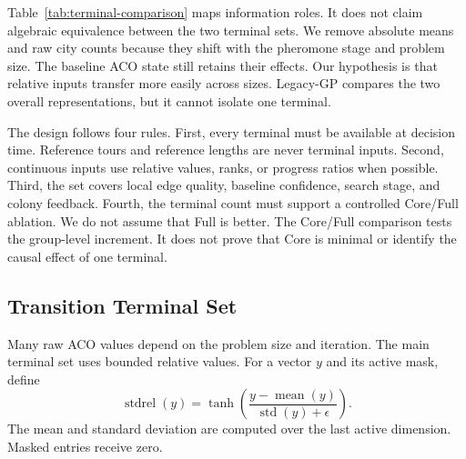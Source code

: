 \documentclass[letterpaper,journal]{IEEEtran}
\newcommand{\stdrel}{\operatorname{stdrel}}
\begin{document}
Table~\ref{tab:terminal-comparison} maps information roles.
It does not claim algebraic equivalence between the two terminal sets.
We remove absolute means and raw city counts because they shift with the
pheromone stage and problem size.
The baseline ACO state still retains their effects.
Our hypothesis is that relative inputs transfer more easily across sizes.
Legacy-GP compares the two overall representations, but it cannot isolate one
terminal.

The design follows four rules.
First, every terminal must be available at decision time.
Reference tours and reference lengths are never terminal inputs.
Second, continuous inputs use relative values, ranks, or progress ratios when
possible.
Third, the set covers local edge quality, baseline confidence, search stage,
and colony feedback.
Fourth, the terminal count must support a controlled Core/Full ablation.
We do not assume that Full is better.
The Core/Full comparison tests the group-level increment.
It does not prove that Core is minimal or identify the causal effect of one
terminal.

\subsection{Transition Terminal Set}

Many raw ACO values depend on the problem size and iteration.
The main terminal set uses bounded relative values.
For a vector \(y\) and its active mask, define
\begin{equation}
    \stdrel(y)
    =
    \tanh\left(
    \frac{y-\operatorname{mean}(y)}
    {\operatorname{std}(y)+\epsilon}
    \right).
    \label{eq:stdrel}
\end{equation}
The mean and standard deviation are computed over the last active dimension.
Masked entries receive zero.
\end{document}
